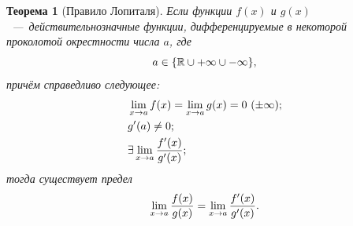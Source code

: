 \documentclass[12pt]{article}
\newtheorem{theorem}{Теорема}[section]
\begin{document}
\begin{theorem}[Правило Лопиталя]
Если функции $f(x)$ и $g(x)$~\----~действительнозначные функции, дифференцируемые в некоторой проколотой окрестности числа $a$, где 
\begin{equation}
    a \in \qty{\mathbb{R}\cup +\infty \cup -\infty},
\end{equation}
причём справедливо следующее:
\begin{align}
    &\lim_{x\rightarrow a}{f\qty(x)} = \lim_{x\rightarrow a}{g\qty(x)} = 0\ (\pm \infty);\\
    &g'\qty(a)\ne 0;\\
    &\exists \lim_{x\rightarrow a}{\dfrac{f'\qty(x)}{g'\qty(x)}};
\end{align}
тогда существует предел
\begin{equation}
    \lim_{x\rightarrow a}{\dfrac{f\qty(x)}{g\qty(x)}} = \lim_{x\rightarrow a}{\dfrac{f'\qty(x)}{g'\qty(x)}}.
\end{equation}
\end{theorem}
\end{document}
